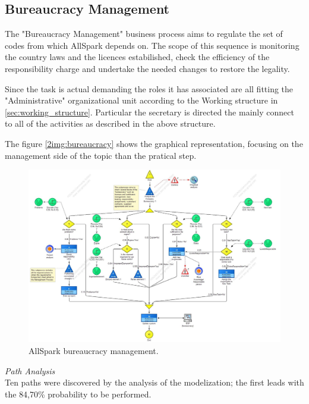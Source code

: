 %

\subsection{Bureaucracy Management}
The "Bureaucracy Management" business process aims to regulate the set of codes from which AllSpark depends on. The scope of this sequence is monitoring the country laws and the licences estabilished, check the efficiency of the responsibility charge and undertake the needed changes to restore the legality.

Since the task is actual demanding the roles it has associated are all fitting the "Administrative" organizational unit according to the Working structure in \ref{sec:working_structure}. Particular the secretary is directed the mainly connect to all of the activities as described in the above structure.

The figure \ref{2img:bureaucracy} shows the graphical representation, focusing on the management side of the topic than the pratical step.\\

\begin{figure}[ht!]
\begin{centering}
\includegraphics[scale=0.35, angle=90]{assign2/adonis/imgs/bureaucracy.jpg}
\caption{AllSpark bureaucracy management.}
\label{2img:bureacracy}
\end{centering}
\end{figure}

\noindent
\emph{Path Analysis}\\
Ten paths were discovered by the analysis of the modelization; the first leads with the 84,70\% probability to be performed. 

